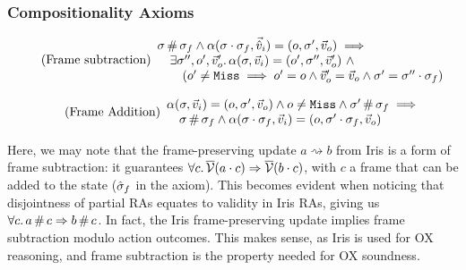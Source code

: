 \subsubsection{Compositionality Axioms}

\begin{equation}
\tag{Frame subtraction}\label{eq:frame-sub}
\begin{array}{l}
\sigma\operatorname{\#}\sigma_f \land \alpha(\sigma\cdot\sigma_f,\vec{\hat{v}}_i)=(o, \sigma',\vec{v}_o) \implies \\
\quad\exists \sigma'', o', \vec{v}_o'\ldotp \alpha(\sigma,\vec{v}_i)=(o', \sigma'', \vec{v}_o') ~\land \\
\qquad(o' \neq \texttt{Miss} \implies o' = o \land  \vec{v}_o' = \vec{v}_o \land \sigma' = \sigma'' \cdot \sigma_f)
\end{array}
\end{equation}

\begin{equation}
\tag{Frame Addition}\label{eq:frame-add}
\begin{array}{l}
\alpha(\sigma,\vec{v}_i)=(o, \sigma', \vec{v}_o) \land o \neq \texttt{Miss} \land \sigma'\operatorname{\#}\sigma_f\implies\\
\quad\sigma \operatorname{\#} \sigma_f \land \alpha(\sigma\cdot\sigma_f, \vec{v}_i)=(o, \sigma'\cdot\sigma_f, \vec{v}_o)
\end{array}
\end{equation}

Here, we may note that the frame-preserving update $a \rightsquigarrow b$ from Iris is a form of frame subtraction: it guarantees $\forall c\ldotp \overline{\cal V}(a \cdot c)\Rightarrow \overline{\cal V}(b\cdot c)$, with $c$ a frame that can be added to the state ($\hat{\sigma}_f$ in the axiom). This becomes evident when noticing that disjointness of partial RAs equates to validity in Iris RAs, giving us $\forall c\ldotp a\operatorname{\#} c\Rightarrow b\operatorname{\#} c$. In fact, the Iris frame-preserving update implies frame subtraction modulo action outcomes. This makes sense, as Iris is used for OX reasoning, and frame subtraction is the property needed for OX soundness. 

